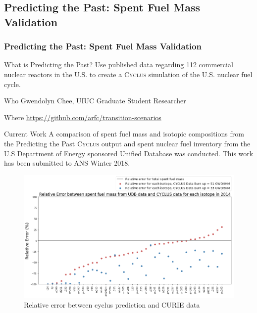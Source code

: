 
\newcommand{\Cyclus}{\textsc{Cyclus}\xspace}%
\subsection{Predicting the Past: Spent Fuel Mass Validation}
\begin{frame}
  \frametitle{Predicting the Past: Spent Fuel Mass Validation}

\begin{block}{What is Predicting the Past? }
Use published data regarding 112 commercial nuclear reactors in the U.S. to create a \Cyclus simulation of the U.S. nuclear fuel cycle.
\end{block}


\begin{block}{Who}
Gwendolyn Chee, UIUC Graduate Student Researcher
\end{block}

\begin{block}{Where}
        \url{https://github.com/arfc/transition-scenarios} 
\end{block}
\end{frame}

\begin{frame}
\begin{block}{Current Work}
A comparison of spent fuel mass and isotopic compositions from the Predicting 
the Past \Cyclus output and spent nuclear fuel inventory from the U.S 
Department of Energy sponsored Unified Database\cite{peterson_unf-st&dards_2017} was conducted. This work has been submitted to ANS Winter 2018.
\end{block}

\begin{figure}[htbp!]
                \begin{center}
                        \includegraphics[height=0.7\textheight]{./images/relative_error_2014.png}
                        \caption{Relative error between cyclus prediction and 
                                CURIE data}
                \end{center}
        \end{figure}

\end{frame}


